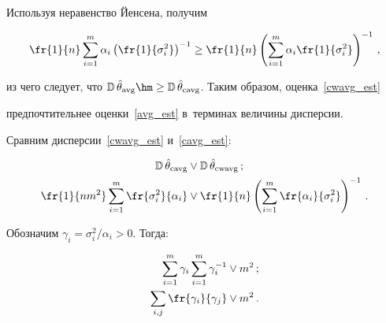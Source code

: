 Используя неравенство Йенсена, получим





\noindent


$$


\fr{1}{n}\sum\limits_{i=1}^m \alpha_i\left(\fr{1}{\sigma_i^2}\right)^{-1} 


\ge \fr{1}{n} \left(\sum\limits_{i=1}^m \alpha_i\fr{1}{\sigma_i^2}\right)^{-1}\,,


$$


из чего следует, что $\mathbb{D}\,\hat{\theta}_{\mathrm{avg}} \hm\ge 


\mathbb{D}\,\hat{\theta}_{\mathrm{cavg}}$. Таким образом, оценка~\eqref{cwavg_est} 


предпочтительнее оценки~\eqref{avg_est} в~терминах величины дисперсии.








Сравним дисперсии~\eqref{cwavg_est} и~\eqref{cavg_est}:





\noindent


\begin{align*}


\mathbb{D}\,\hat{\theta}_{\mathrm{cavg}} &\vee \mathbb{D}\,\hat{\theta}_{\mathrm{cwavg}}\,; \\


\fr{1}{n m^2}\sum\limits_{i=1}^m \fr{\sigma_i^2}{\alpha_i} &\vee \fr{1}{n} 


\left(\sum\limits_{i=1}^m\fr{\alpha_i}{\sigma_i^2}\right)^{-1}\,.


\end{align*}


Обозначим $\gamma_i = {\sigma_i^2}/{\alpha_i} > 0$. Тогда:





\vspace*{-2pt}





\noindent


\begin{align*}


\sum\limits_{i=1}^m\gamma_i \sum\limits_{i=1}^m\gamma_i^{-1} &\vee m^2\,; \\


\sum\limits_{i,j} \fr{\gamma_i}{\gamma_j} &\vee m^2\,.


\end{align*}





